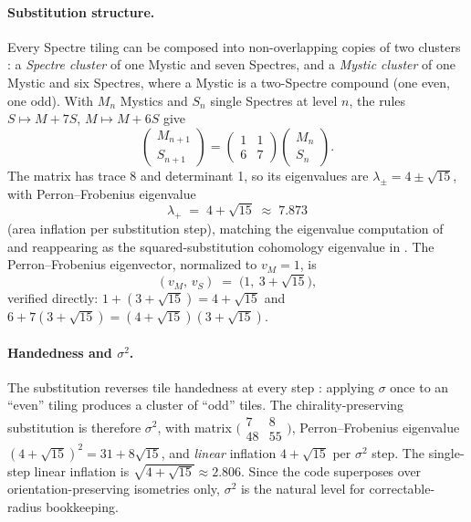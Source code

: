 \documentclass[a4paper,unpublished]{quantumarticle}
\theoremstyle{remark}
\begin{document}
\paragraph{Substitution structure.}
Every Spectre tiling can be composed into non-overlapping copies of
two clusters \cite[Fig.~2.1]{Smith2024spectre}: a \emph{Spectre
cluster} of one Mystic and seven Spectres, and a \emph{Mystic
cluster} of one Mystic and six Spectres, where a Mystic is a
two-Spectre compound (one even, one odd). With $M_{n}$ Mystics and
$S_{n}$ single Spectres at level $n$, the rules
$S \mapsto M + 7S$, $M \mapsto M + 6S$ give
\begin{equation}
\begin{pmatrix} M_{n+1} \\ S_{n+1} \end{pmatrix}
= \begin{pmatrix} 1 & 1 \\ 6 & 7 \end{pmatrix}
\begin{pmatrix} M_{n} \\ S_{n} \end{pmatrix} .
\label{eq:Mspec}
\end{equation}
The matrix has trace 8 and determinant 1, so its eigenvalues are
$\lambda_{\pm} = 4 \pm \sqrt{15}$, with Perron--Frobenius eigenvalue
\begin{equation}
\lambda_{+} \;=\; 4 + \sqrt{15} \;\approx\; 7.873
\label{eq:lamspec}
\end{equation}
(area inflation per substitution step), matching the eigenvalue
computation of \cite{Smith2024spectre} and reappearing as the
squared-substitution cohomology eigenvalue in
\cite[Thm.~1]{BGMS2025}. The Perron--Frobenius eigenvector,
normalized to $v_{M} = 1$, is
\[
(v_{M},\, v_{S}) \;=\; \bigl( 1,\ 3 + \sqrt{15} \bigr),
\]
verified directly: $1 + (3+\sqrt{15}) = 4+\sqrt{15}$ and
$6 + 7(3+\sqrt{15}) = (4+\sqrt{15})(3+\sqrt{15})$.

\paragraph{Handedness and $\sigma^{2}$.}
The substitution reverses tile handedness at every step
\cite{Smith2024spectre}: applying $\sigma$ once to an ``even'' tiling
produces a cluster of ``odd'' tiles. The chirality-preserving
substitution is therefore $\sigma^{2}$, with matrix
$\bigl(\begin{smallmatrix} 7 & 8 \\ 48 & 55 \end{smallmatrix}\bigr)$,
Perron--Frobenius eigenvalue $(4+\sqrt{15})^{2} = 31 + 8\sqrt{15}$,
and \emph{linear} inflation $4+\sqrt{15}$ per $\sigma^{2}$ step. The
single-step linear inflation is $\sqrt{4+\sqrt{15}} \approx 2.806$.
Since the code superposes over orientation-preserving isometries
only, $\sigma^{2}$ is the natural level for correctable-radius
bookkeeping.
\end{document}
